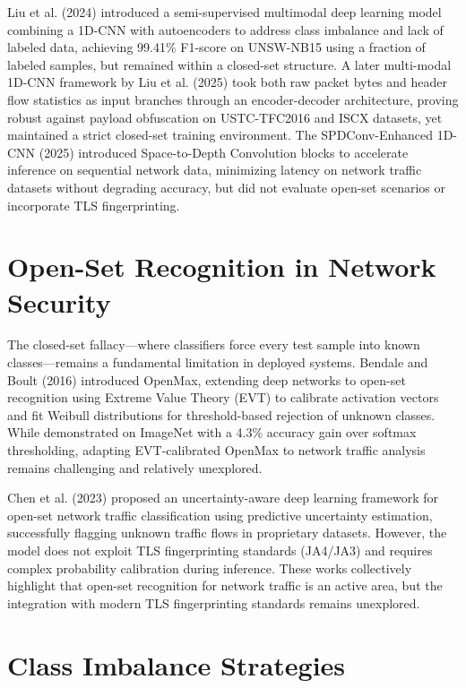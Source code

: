 \documentclass[12pt,a4paper]{report}
\begin{document}
Liu et al. (2024) introduced a semi-supervised multimodal deep learning model combining a 1D-CNN with autoencoders to address class imbalance and lack of labeled data, achieving 99.41\% F1-score on UNSW-NB15 using a fraction of labeled samples, but remained within a closed-set structure. A later multi-modal 1D-CNN framework by Liu et al. (2025) took both raw packet bytes and header flow statistics as input branches through an encoder-decoder architecture, proving robust against payload obfuscation on USTC-TFC2016 and ISCX datasets, yet maintained a strict closed-set training environment. The SPDConv-Enhanced 1D-CNN (2025) introduced Space-to-Depth Convolution blocks to accelerate inference on sequential network data, minimizing latency on network traffic datasets without degrading accuracy, but did not evaluate open-set scenarios or incorporate TLS fingerprinting.

\section{Open-Set Recognition in Network Security}

The closed-set fallacy---where classifiers force every test sample into known classes---remains a fundamental limitation in deployed systems. Bendale and Boult (2016) introduced OpenMax, extending deep networks to open-set recognition using Extreme Value Theory (EVT) to calibrate activation vectors and fit Weibull distributions for threshold-based rejection of unknown classes. While demonstrated on ImageNet with a 4.3\% accuracy gain over softmax thresholding, adapting EVT-calibrated OpenMax to network traffic analysis remains challenging and relatively unexplored.

Chen et al. (2023) proposed an uncertainty-aware deep learning framework for open-set network traffic classification using predictive uncertainty estimation, successfully flagging unknown traffic flows in proprietary datasets. However, the model does not exploit TLS fingerprinting standards (JA4/JA3) and requires complex probability calibration during inference. These works collectively highlight that open-set recognition for network traffic is an active area, but the integration with modern TLS fingerprinting standards remains unexplored.

\section{Class Imbalance Strategies}
\end{document}
